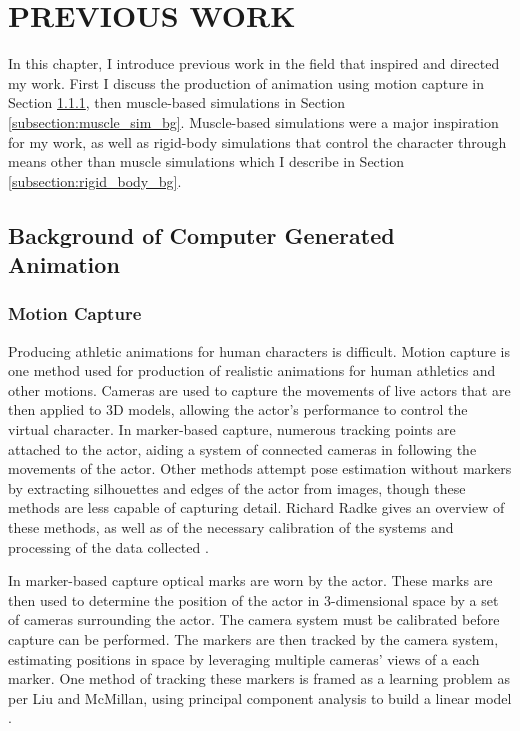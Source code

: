 
 
\chapter{PREVIOUS WORK}
\label{chapter:previous_work}
In this chapter, I introduce previous work in the field that inspired and directed my work. First I discuss the production of animation using motion capture in Section \ref{subsection:mocap_bg}, then muscle-based simulations in Section \ref{subsection:muscle_sim_bg}.  Muscle-based simulations were a major inspiration for my work, as well as rigid-body simulations that control the character through means other than muscle simulations which I describe in Section \ref{subsection:rigid_body_bg}.

\section{Background of Computer Generated Animation}
\label{section:computer_gen_bg}
\subsection{Motion Capture}
\label{subsection:mocap_bg}
Producing athletic animations for human characters is difficult.  Motion capture is one method used for production of realistic animations for human athletics and other motions. Cameras are used to capture the movements of live actors that are then applied to 3D models, allowing the actor's performance to control the virtual character.  In marker-based capture, numerous tracking points are attached to the actor, aiding a system of connected cameras in following the movements of the actor.  Other methods attempt pose estimation without markers by extracting silhouettes and edges of the actor from images, though these methods are less capable of capturing detail. Richard Radke gives an overview of these methods, as well as of the necessary calibration of the systems and processing of the data collected \cite{radke}.

In marker-based capture optical marks are worn by the actor.  These marks are then used to determine the position of the actor in 3-dimensional space by a set of cameras surrounding the actor.  The camera system must be calibrated before capture can be performed.  The markers are then tracked by the camera system, estimating positions in space by leveraging multiple cameras' views of a each marker.  One method of tracking these markers is framed as a learning problem as per Liu and McMillan, using principal component analysis to build a linear model \cite{liu_mocap}.  

